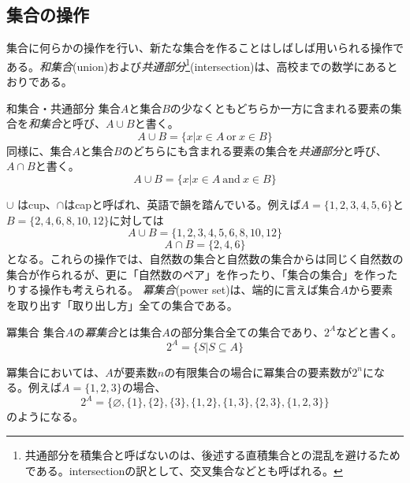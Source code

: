 \subsection{集合の操作}
集合に何らかの操作を行い、新たな集合を作ることはしばしば用いられる操作である。\emph{和集合}(union)および\emph{共通部分}\footnote{共通部分を積集合と呼ばないのは、後述する直積集合との混乱を避けるためである。intersectionの訳として、交叉集合などとも呼ばれる。}(intersection)は、高校までの数学にあるとおりである。
\begin{definition*}{和集合・共通部分}
	集合\(A\)と集合\(B\)の少なくともどちらか一方に含まれる要素の集合を\emph{和集合}と呼び、\(A \cup B\)と書く。
	\begin{equation}
		A \cup B=\{x| x \in A \ \mathrm{or} \ x \in B\}
	\end{equation}
	同様に、集合\(A\)と集合\(B\)のどちらにも含まれる要素の集合を\emph{共通部分}と呼び、\(A \cap B\)と書く。
	\begin{equation}
		A \cup B=\{x| x \in A \ \mathrm{and} \ x \in B\}
	\end{equation}
\end{definition*}
\(\cup\) はcup、\(\cap\)はcapと呼ばれ、英語で韻を踏んでいる。例えば\(A=\{ 1,2,3,4,5,6\}\)と\(B=\{2,4,6,8,10,12\}\)に対しては
\begin{equation}
	A \cup B=\{1,2,3,4,5,6,8,10,12\}
\end{equation}
\begin{equation}
	A \cap B=\{2,4,6\}
\end{equation}
となる。これらの操作では、自然数の集合と自然数の集合からは同じく自然数の集合が作られるが、更に「自然数のペア」を作ったり、「集合の集合」を作ったりする操作も考えられる。
\emph{冪集合}(power set)は、端的に言えば集合\(A\)から要素を取り出す「取り出し方」全ての集合である。
\begin{definition*}{冪集合}
	集合\(A\)の\emph{冪集合}とは集合\(A\)の部分集合全ての集合であり、\(2^A\)などと書く。
	\begin{equation}
		2^A=\{S| S \subseteq A\}
	\end{equation}
\end{definition*}
冪集合においては、\(A\)が要素数\(n\)の有限集合の場合に冪集合の要素数が\(2^n\)になる。例えば\(A=\{1,2,3\}\)の場合、
\begin{equation}
	2^A=\{ \varnothing , \{1\},\{2\}, \{3\}, \{1,2\}, \{1,3\}, \{2,3\}, \{1,2,3\} \}
\end{equation}
のようになる。
